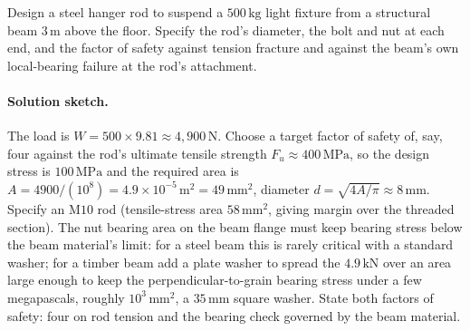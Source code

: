 \begin{exercise}
Design a steel hanger rod to suspend a $500\,\si{\kilogram}$ light
fixture from a structural beam $3\,\si{\meter}$ above the floor.
Specify the rod's diameter, the bolt and nut at each end, and the
factor of safety against tension fracture and against the beam's
own local-bearing failure at the rod's attachment.

\paragraph{Solution sketch.} The load is $W = 500 \times 9.81 \approx
4{,}900\,\text{N}$. Choose a target factor of safety of, say, four
against the rod's ultimate tensile strength
$F_u \approx 400\,\text{MPa}$, so the design stress is
$100\,\text{MPa}$ and the required area is $A = 4900/(10^{8}) =
4.9 \times 10^{-5}\,\si{\meter\squared} = 49\,\si{\milli\meter\squared}$,
diameter $d = \sqrt{4A/\pi} \approx 8\,\si{\milli\meter}$. Specify an
$\text{M10}$ rod (tensile-stress area $58\,\si{\milli\meter\squared}$,
giving margin over the threaded section). The nut bearing area on the
beam flange must keep bearing stress below the beam material's limit:
for a steel beam this is rarely critical with a standard washer; for a
timber beam add a plate washer to spread the $4.9\,\text{kN}$ over an
area large enough to keep the perpendicular-to-grain bearing stress
under a few megapascals, roughly $10^{3}\,\si{\milli\meter\squared}$, a
$35\,\si{\milli\meter}$ square washer. State both factors of safety:
four on rod tension and the bearing check governed by the beam material.
\end{exercise}


